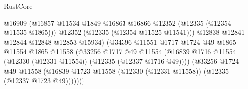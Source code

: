 \begin{lexlean}{RustCore}
\begin{coremodule}
                                                    @16909
                                                    (@16857
                                                      @11534
                                                      @1849
                                                      @16863
                                                      @16866
                                                      @12352
                                                      (@12335 (@12354 @11535 @1865)))
                                                    @12352
                                                    (@12335 (@12354 @11525 @11541)))
                                                  @12838
                                                  @12841
                                                  @12844
                                                  @12848
                                                  @12853
                                                  @15934)
                                                (@34396
                                                  @11551
                                                  @1717
                                                  @1724
                                                  @49
                                                  @1865
                                                  @11554
                                                  @1865
                                                  @11558
                                                  (@33256
                                                    @1717
                                                    @49
                                                    @11554
                                                    (@16839
                                                      @1716
                                                      @11554
                                                      (@12330 (@12331 @11554))
                                                      (@12335 (@12337 @1716 @49))))
                                                  (@33256
                                                    @1724
                                                    @49
                                                    @11558
                                                    (@16839
                                                      @1723
                                                      @11558
                                                      (@12330 (@12331 @11558))
                                                      (@12335 (@12337 @1723 @49)))))))

\end{coremodule}
\end{lexlean}
